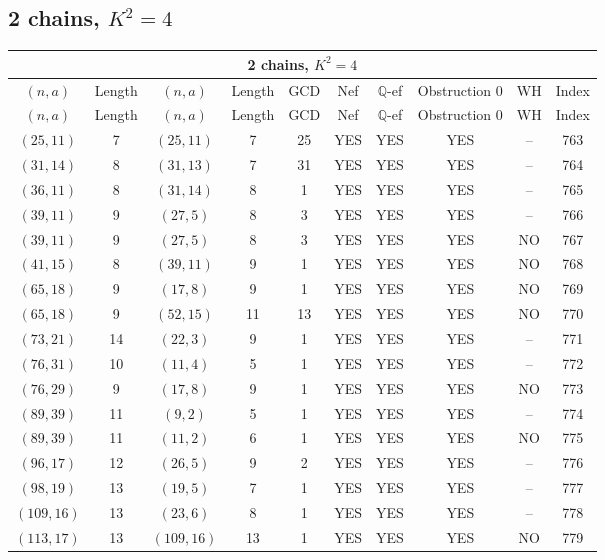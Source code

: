 \subsection{2 chains, $K^2 = 4$}
\begin{longtable}{|c|c|c|c|c|c|c|c|c|c|}
\hline
\multicolumn{10}{|c|}{2 chains, $K^2 = 4$}\\
\hline
$(n,a)$ & Length & $(n,a)$ & Length & GCD & Nef & $\mathbb Q$-ef & Obstruction 0 & WH & Index\\
\hline
\endfirsthead

\hline
$(n,a)$ & Length & $(n,a)$ & Length & GCD & Nef & $\mathbb Q$-ef & Obstruction 0 & WH & Index\\
\hline
\endhead
\hline
\endfoot

$(25, 11)$ & 7 & $(25, 11)$ & 7 & 25 & YES & YES & YES & -- & 763\\
$(31, 14)$ & 8 & $(31, 13)$ & 7 & 31 & YES & YES & YES & -- & 764\\
$(36, 11)$ & 8 & $(31, 14)$ & 8 & 1 & YES & YES & YES & -- & 765\\
$(39, 11)$ & 9 & $(27, 5)$ & 8 & 3 & YES & YES & YES & -- & 766\\
$(39, 11)$ & 9 & $(27, 5)$ & 8 & 3 & YES & YES & YES & NO & 767\\
$(41, 15)$ & 8 & $(39, 11)$ & 9 & 1 & YES & YES & YES & NO & 768\\
$(65, 18)$ & 9 & $(17, 8)$ & 9 & 1 & YES & YES & YES & NO & 769\\
$(65, 18)$ & 9 & $(52, 15)$ & 11 & 13 & YES & YES & YES & NO & 770\\
$(73, 21)$ & 14 & $(22, 3)$ & 9 & 1 & YES & YES & YES & -- & 771\\
$(76, 31)$ & 10 & $(11, 4)$ & 5 & 1 & YES & YES & YES & -- & 772\\
$(76, 29)$ & 9 & $(17, 8)$ & 9 & 1 & YES & YES & YES & NO & 773\\
$(89, 39)$ & 11 & $(9, 2)$ & 5 & 1 & YES & YES & YES & -- & 774\\
$(89, 39)$ & 11 & $(11, 2)$ & 6 & 1 & YES & YES & YES & NO & 775\\
$(96, 17)$ & 12 & $(26, 5)$ & 9 & 2 & YES & YES & YES & -- & 776\\
$(98, 19)$ & 13 & $(19, 5)$ & 7 & 1 & YES & YES & YES & -- & 777\\
$(109, 16)$ & 13 & $(23, 6)$ & 8 & 1 & YES & YES & YES & -- & 778\\
$(113, 17)$ & 13 & $(109, 16)$ & 13 & 1 & YES & YES & YES & NO & 779\\

\end{longtable}
